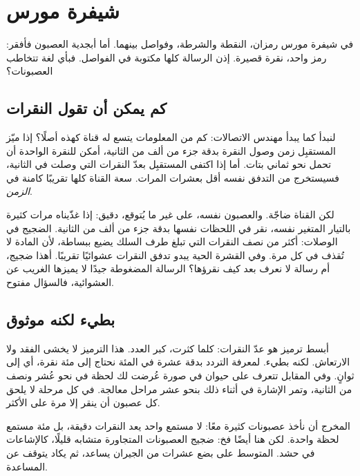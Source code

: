 \chapter{شيفرة مورس}

في شيفرة مورس رمزان، النقطة والشرطة، وفواصل بينهما. أما أبجدية العصبون فأفقر: رمز واحد، نقرة قصيرة. إذن الرسالة كلها مكتوبة في الفواصل. فبأي لغة تتخاطب العصبونات؟

\section*{كم يمكن أن تقول النقرات}

لنبدأ كما يبدأ مهندس الاتصالات: كم من المعلومات يتسع له قناة كهذه أصلًا؟ إذا ميّز المستقبِل زمن وصول النقرة بدقة جزء من ألف من الثانية، أمكن للنقرة الواحدة أن تحمل نحو ثماني بتات. أما إذا اكتفى المستقبِل بعدّ النقرات التي وصلت في الثانية، فسيستخرج من التدفق نفسه أقل بعشرات المرات. سعة القناة كلها تقريبًا كامنة في \emph{الزمن}.


لكن القناة ضاجّة. والعصبون نفسه، على غير ما يُتوقع، دقيق: إذا غذّيناه مرات كثيرة بالتيار المتغير نفسه، نقر في اللحظات نفسها بدقة جزء من ألف من الثانية. الضجيج في الوصلات: أكثر من نصف النقرات التي تبلغ طرف السلك يضيع ببساطة، لأن المادة لا تُقذف في كل مرة. وفي القشرة الحية يبدو تدفق النقرات عشوائيًا تقريبًا. أهذا ضجيج، أم رسالة لا نعرف بعد كيف نقرؤها؟ الرسالة المضغوطة جيدًا لا يميزها الغريب عن العشوائية، فالسؤال مفتوح.

\section*{بطيء لكنه موثوق}

أبسط ترميز هو عدّ النقرات: كلما كثرت، كبر العدد. هذا الترميز لا يخشى الفقد ولا الارتعاش. لكنه بطيء. لمعرفة التردد بدقة عشرة في المئة نحتاج إلى مئة نقرة، أي إلى ثوانٍ. وفي المقابل تتعرف على حيوان في صورة عُرضت لك لحظة في نحو عُشر ونصف من الثانية، وتمر الإشارة في أثناء ذلك بنحو عشر مراحل معالجة. في كل مرحلة لا يلحق كل عصبون أن ينقر إلا مرة على الأكثر.

المخرج أن نأخذ عصبونات كثيرة معًا: لا مستمع واحد يعد النقرات دقيقة، بل مئة مستمع لحظة واحدة. لكن هنا أيضًا فخ: ضجيج العصبونات المتجاورة متشابه قليلًا، كالإشاعات في حشد. المتوسط على بضع عشرات من الجيران يساعد، ثم يكاد يتوقف عن المساعدة.

